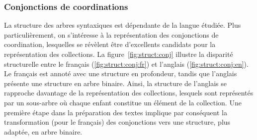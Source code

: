 \subsubsection{Conjonctions de coordinations}

La structure des arbres syntaxiques est dépendante de la langue étudiée.
Plus particulièrement, on s'intéresse à la représentation des conjonctions de coordination, lesquelles se révèlent être d'excellents candidats pour la représentation des collections.
La figure~\ref{fig:struct:conj} illustre la disparité structurelle entre le français (\ref{fig:struct:conj:fr}) et l'anglais (\ref{fig:struct:conj:en}).
Le français est annoté avec une structure en profondeur, tandis que l'anglais présente une structure en arbre binaire.
Ainsi, la structure de l'anglais se rapproche davantage de la représentation des collections, lesquels sont représentés par un sous-arbre où chaque enfant constitue un élément de la collection.
Une première étape dans la préparation des textes implique par conséquent la transformation (pour le français) des conjonctions vers une structure, plus adaptée, en arbre binaire.

